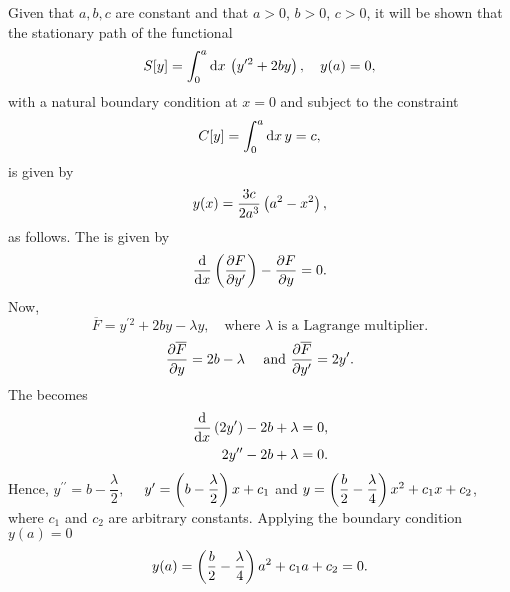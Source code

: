 \begin{question}
Given that $a, b, c$ are constant and that $a > 0$, $b > 0$, $c > 0$, it will be shown that the stationary path of the functional
\[
	S[y] = \int_{0}^{a}\mathrm{d} x\, \left(y^{\prime 2} + 2b y\right),\quad y(a) = 0,
\]
with a natural boundary condition at $x = 0$ and subject to the constraint
\[
	C[y] = \int_{0}^{a}\mathrm{d} x\, y = c,
\]
is given by
\[
	y(x) = \frac{3c}{2a^3}\left(a^2-x^2\right),
\]
 as follows.
 The \el is given by
 \[
 	\frac{\mathrm{d}}{\mathrm{d}x}\left(\frac{\partial F}{\partial y^\prime}\right)-\frac{\partial F}{\partial y} = 0.
 \]
 Now, 
 \[
 	\overline{F} = y^{\prime 2} + 2b y -\lambda y,\quad\text{where } \lambda\text{ is a Lagrange multiplier.}
 \]
 \[
 	\frac{\partial \overline{F}}{\partial y} =2b -\lambda\quad\text{ and } \frac{\partial \overline{F}}{\partial y^\prime} = 2y^\prime.
 \]
 The \el becomes
 \begin{align*}
 	\frac{\mathrm{d}}{\mathrm{d}x}\left(2y^\prime\right)-2b+\lambda = 0,\\
 	2y^{\prime\prime} - 2b + \lambda = 0.
 \end{align*}
 Hence, $y^{\prime\prime}=b-\dfrac{\lambda}{2},\quad$ 
 $y^{\prime}=\left(b-\dfrac{\lambda}{2}\right) x+c_1$ and 
 $y=\left(\dfrac{b}{2}-\dfrac{\lambda}{4}\right) x^2 + c_1x + c_2$, where $c_1$ and $c_2$ are arbitrary constants.  Applying the boundary condition $y(a)=0$
 \[
 	y(a)=\left(\dfrac{b}{2}-\dfrac{\lambda}{4}\right) a^2 + c_1a + c_2=0.
 \]
 \end{question}